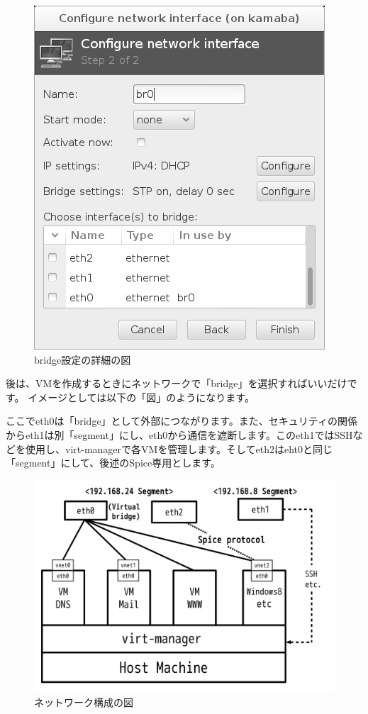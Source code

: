 \documentclass[mingoth,a4paper]{jsarticle}
\begin{document}
\begin{figure}[!b]
\centering
\includegraphics{image201404/bridge2_mono.png}
\caption{bridge設定の詳細の図}
\end{figure}
\clearpage

後は、VMを作成するときにネットワークで「bridge」を選択すればいいだけです。
イメージとしては以下の「図」のようになります。

ここでeth0は「bridge」として外部につながります。また、セキュリティの関係からeth1は別「segment」にし、eth0から通信を遮断します。このeth1ではSSHなどを使用し、virt-managerで各VMを管理します。そしてeth2はeht0と同じ「segment」にして、後述のSpice専用とします。

\begin{figure}[!h]
\centering
\includegraphics[scale=0.3]{image201404/kvmnetwork3.png}
\caption{ネットワーク構成の図}
\end{figure}
\end{document}
